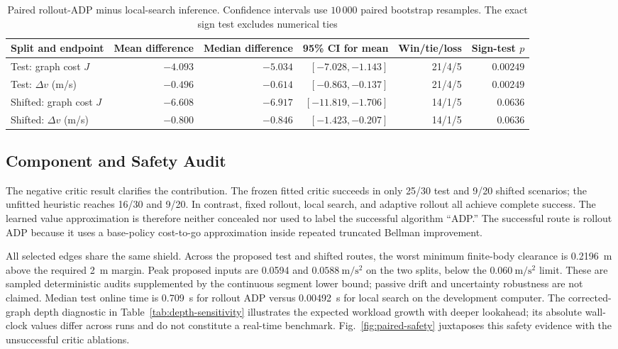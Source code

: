 \documentclass{IEEEtaes}
\newcommand{\unit}[2]{#1~#2}
\theoremstyle{remark}
\theoremstyle{plain}
\begin{document}
\begin{table}[t]
  \centering
  \caption{Paired rollout-ADP minus local-search inference. Confidence intervals use $10\,000$ paired bootstrap resamples. The exact sign test excludes numerical ties}
  \label{tab:paired-inference}
  \renewcommand{\arraystretch}{1.06}
  \setlength{\tabcolsep}{5pt}
  \footnotesize
  \begin{tabular}{@{}lrrrrr@{}}
    \toprule
    Split and endpoint & Mean difference & Median difference & 95\% CI for mean & Win/tie/loss & Sign-test $p$ \\
    \midrule
    Test: graph cost $J$ & $-4.093$ & $-5.034$ & $[-7.028,-1.143]$ & 21/4/5 & $0.00249$ \\
    Test: $\Delta v$ (m/s) & $-0.496$ & $-0.614$ & $[-0.863,-0.137]$ & 21/4/5 & $0.00249$ \\
    Shifted: graph cost $J$ & $-6.608$ & $-6.917$ & $[-11.819,-1.706]$ & 14/1/5 & $0.0636$ \\
    Shifted: $\Delta v$ (m/s) & $-0.800$ & $-0.846$ & $[-1.423,-0.207]$ & 14/1/5 & $0.0636$ \\
    \bottomrule
  \end{tabular}
\end{table}

\subsection{Component and Safety Audit}

The negative critic result clarifies the contribution. The frozen fitted critic succeeds in only 25/30 test and 9/20 shifted scenarios; the unfitted heuristic reaches 16/30 and 9/20. In contrast, fixed rollout, local search, and adaptive rollout all achieve complete success. The learned value approximation is therefore neither concealed nor used to label the successful algorithm ``ADP.'' The successful route is rollout ADP because it uses a base-policy cost-to-go approximation inside repeated truncated Bellman improvement.

All selected edges share the same shield. Across the proposed test and shifted routes, the worst minimum finite-body clearance is \unit{0.2196}{m} above the required \unit{2}{m} margin. Peak proposed inputs are 0.0594 and $0.0588~\mathrm{m/s^2}$ on the two splits, below the $0.060~\mathrm{m/s^2}$ limit. These are sampled deterministic audits supplemented by the continuous segment lower bound; passive drift and uncertainty robustness are not claimed. Median test online time is \unit{0.709}{s} for rollout ADP versus \unit{0.00492}{s} for local search on the development computer. The corrected-graph depth diagnostic in Table~\ref{tab:depth-sensitivity} illustrates the expected workload growth with deeper lookahead; its absolute wall-clock values differ across runs and do not constitute a real-time benchmark. Fig.~\ref{fig:paired-safety} juxtaposes this safety evidence with the unsuccessful critic ablations.
\end{document}
